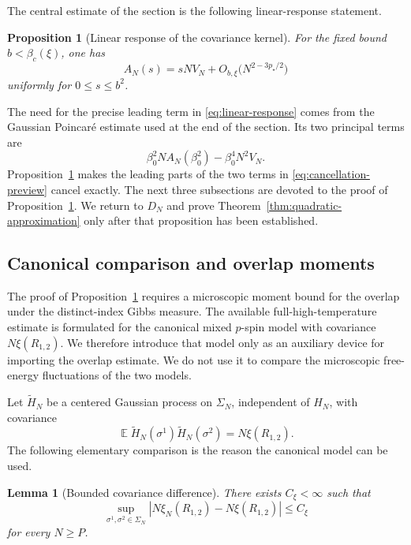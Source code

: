 \documentclass[letterpaper,11pt,reqno]{amsart}
\newtheorem{lem}[thm]{Lemma}
\newtheorem{prop}[thm]{Proposition}
\renewcommand{\leq}{\leqslant}
\renewcommand{\geq}{\geqslant}
\DeclareMathOperator{\E}{\mathds{E}}
\begin{document}
The central estimate of the section is the following linear-response
statement.

\begin{prop}[Linear response of the covariance kernel]
\label{prop:linear-response}
For the fixed bound $b<\beta_c(\xi)$, one has
\begin{equation}
A_N(s)
=
sN V_N
+
O_{b,\xi}\bigl(N^{2-3p_\star/2}\bigr)
\label{eq:linear-response}
\end{equation}
uniformly for $0\leq s\leq b^2$.
\end{prop}

The need for the precise leading term in
\eqref{eq:linear-response} comes from the Gaussian Poincar\'e estimate
used at the end of the section. Its two principal terms are
\begin{equation}
\beta_0^2N A_N(\beta_0^2)-\beta_0^4N^2V_N.
\label{eq:cancellation-preview}
\end{equation}
Proposition~\ref{prop:linear-response} makes the leading parts of the
two terms in \eqref{eq:cancellation-preview} cancel exactly. The next
three subsections are devoted to the proof of
Proposition~\ref{prop:linear-response}. We return to $D_N$ and prove
Theorem~\ref{thm:quadratic-approximation} only after that proposition
has been established.

\subsection{Canonical comparison and overlap moments}
\label{subsec:canonical-overlap}

The proof of Proposition~\ref{prop:linear-response} requires a
microscopic moment bound for the overlap under the distinct-index
Gibbs measure. The available full-high-temperature estimate is
formulated for the canonical mixed $p$-spin model with covariance
$N\xi(R_{1,2})$. We therefore introduce that model only as an
auxiliary device for importing the overlap estimate. We do not use it
to compare the microscopic free-energy fluctuations of the two
models.

Let $\widetilde H_N$ be a centered Gaussian process on $\Sigma_N$,
independent of $H_N$, with covariance
\begin{equation}
\E\widetilde H_N(\sigma^1)\widetilde H_N(\sigma^2)
=
N\xi(R_{1,2}).
\label{eq:canonical-covariance}
\end{equation}
The following elementary comparison is the reason the canonical model
can be used.

\begin{lem}[Bounded covariance difference]
\label{lem:bounded-covariance-difference}
There exists $C_\xi<\infty$ such that
\begin{equation}
\sup_{\sigma^1,\sigma^2\in\Sigma_N}
\left|
N\xi_N(R_{1,2})-N\xi(R_{1,2})
\right|
\leq C_\xi
\label{eq:bounded-covariance-difference-proof}
\end{equation}
for every $N\geq P$.
\end{lem}
\end{document}
